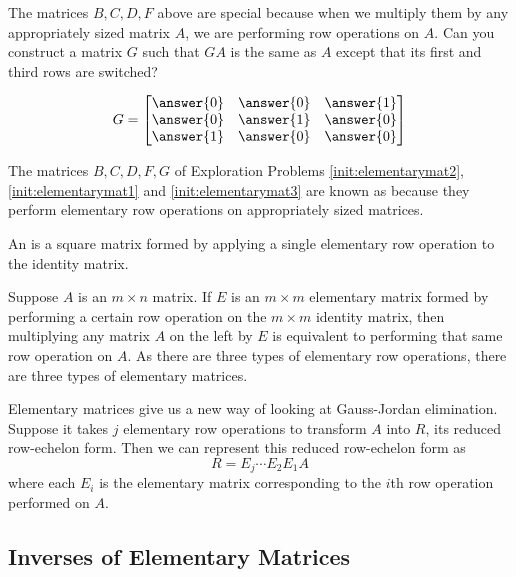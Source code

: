 \documentclass{ximera}
\begin{document}
 
\begin{exploration}\label{init:elementarymat3}
 The matrices $B,C,D,F$ above are special because when we multiply them by any appropriately sized matrix $A$, we are performing row operations on $A$.  Can you construct a matrix $G$ such that $GA$ is the same as $A$ except that its first and third rows are switched?
 
 $$G=\begin{bmatrix}\answer{0} & \answer{0} & \answer{1} \\ \answer{0} & \answer{1} & \answer{0}\\ \answer{1} & \answer{0} & \answer{0}\end{bmatrix}$$

\end{exploration}


The matrices $B,C,D, F, G$ of Exploration Problems \ref{init:elementarymat2}, \ref{init:elementarymat1} and \ref{init:elementarymat3} are known as  because they perform elementary row operations on appropriately sized matrices.

\begin{definition} \label{def:elemmatrix}
  
An  is a square matrix formed by applying a single elementary row operation to the identity matrix.
  
\end{definition}

Suppose $A$ is an $m \times n$ matrix.  If $E$ is an $m \times m$ elementary matrix formed by performing a certain row operation on the $m \times m$ identity matrix, then multiplying any matrix $A$ on the left by $E$ is equivalent to performing that same row operation on $A$.  As there are three types of elementary row operations, there are three types of elementary matrices.

Elementary matrices give us a new way of looking at Gauss-Jordan elimination.  Suppose it takes $j$ elementary row operations to transform $A$ into $R$, its reduced row-echelon form.  Then we can represent this reduced row-echelon form as
$$R = E_j \cdots E_2 E_1 A$$
where each $E_i$ is the elementary matrix corresponding to the $i$th row operation performed on $A$.  

\subsection*{Inverses of Elementary Matrices}
\end{document}
